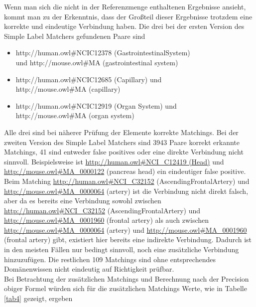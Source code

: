 		Wenn man sich die nicht in der Referenzmenge enthaltenen Ergebnisse ansieht,
		kommt man zu der Erkenntnis, dass der Großteil dieser Ergebnisse trotzdem eine
		korrekte und eindeutige Verbindung haben. Die drei bei der ersten Version des
		Simple Label Matchers gefundenen Paare sind
		\begin{itemize}
		  \item http://human.owl\#NCI\textunderscore C12378
		  (Gastrointestinal\textunderscore System)\\ und
		  http://mouse.owl\#MA (gastrointestinal system)
		  \item http://human.owl\#NCI\textunderscore C12685 (Capillary) und\\
		  http://mouse.owl\#MA (capillary)
		  \item http://human.owl\#NCI\textunderscore C12919 (Organ\textunderscore
		  System) und\\ http://mouse.owl\#MA (organ system)
		\end{itemize}
		Alle drei sind bei näherer Prüfung der Elemente korrekte Matchings. Bei der
		zweiten Version des Simple Label Matchers sind 3943 Paare korrekt erkannte
		Matchings, 41 sind entweder false positives oder eine direkte Verbindung nicht
		sinnvoll. Beispielsweise ist \url{http://human.owl#NCI_C12419 (Head)} und
		\url{http://mouse.owl#MA_0000122} (pancreas head) ein eindeutiger false
		positive. Beim Matching \url{http://human.owl#NCI_C32152}
		(Ascending\textunderscore Frontal\textunderscore Artery) und \url{http://mouse.owl#MA_0000064} (artery)
		ist die Verbindung nicht direkt falsch, aber da es bereits eine Verbindung
		sowohl zwischen \url{http://human.owl#NCI_C32152} (Ascending\textunderscore Frontal\textunderscore Artery)
		und \url{http://mouse.owl#MA_0001960} (frontal artery) als auch zwischen
		\url{http://mouse.owl#MA_0000064} (artery) und
		\url{http://mouse.owl#MA_0001960} (frontal artery) gibt, existiert hier
		bereits eine indirekte Verbindung. Dadurch ist in den meisten Fällen nur
		bedingt sinnvoll, noch eine zusätzliche Verbindung hinzuzufügen. Die
		restlichen 109 Matchings sind ohne entsprechendes Domänenwissen nicht
		eindeutig auf Richtigkeit prüfbar.\\
		Bei Betrachtung der zusätzlichen Matchings und Berechnung nach der Precision
		obiger Formel würden sich für die zusätzlichen Matchings Werte, wie in Tabelle
		\ref{tab4} gezeigt, ergeben
		\begin{center}
		\begin{table}[h!]
		\small
		\noindent{}
		\caption{Vergleich 3 Simple Ontology Matcher OAEI16 Referenz}
		\label{tab4}
		\end{table}
		\end{center}
